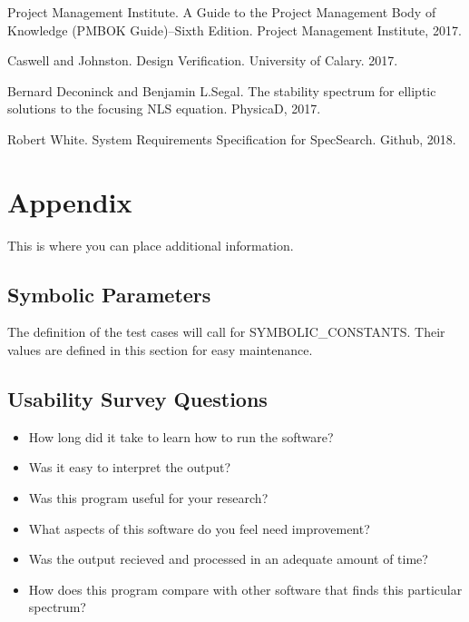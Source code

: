\documentclass[12pt, titlepage]{article}
\begin{document}


\newpage 
\begin{thebibliography}{9} 
	Project Management Institute. 
	A Guide to the Project Management Body of Knowledge (PMBOK Guide)–Sixth 
	Edition. 
	Project Management Institute, 2017. 
	
	Caswell and Johnston. 
	Design Verification. 
	University of Calary. 2017. 
	
	Bernard Deconinck and Benjamin L.Segal. 
	The stability spectrum for elliptic solutions to the focusing NLS equation. 
	PhysicaD, 2017. 
	 
	Robert White. 
	System Requirements Specification for SpecSearch. 
	Github, 2018.
	
\end{thebibliography} 


\newpage

\section{Appendix}

This is where you can place additional information.

\subsection{Symbolic Parameters}

The definition of the test cases will call for SYMBOLIC\_CONSTANTS.
Their values are defined in this section for easy maintenance.

\subsection{Usability Survey Questions}

\begin{itemize}
	\item How long did it take to learn how to run the software? 
	\item Was it easy to interpret the output? 
	\item Was this program useful for your research? 
	\item What aspects of this software do you feel need improvement?
	\item Was the output recieved and processed in an adequate amount of time?
	\item How does this program compare with other software that finds this 
	particular spectrum?
\end{itemize} 
\end{document}
